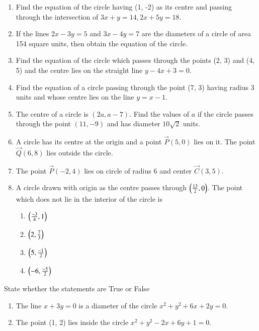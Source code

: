 \begin{enumerate}[label=\thesubsection.\arabic*, ref=\thesubsection.\theenumi, resume*]
 \item Find the equation of the circle having (1, -2) as its centre  and passing through the intersection of $3x+y=14,  2x+5y=18$.
\item If the lines $2x-3y=5$ and $3x-4y=7$ are the diameters of a circle of area 154 square units,  then obtain the equation of the circle.
\item Find the equation of the circle which passes through the points (2, 3) and (4, 5) and the centre lies on the straight line $y-4x+3=0$.
\item Find the equation of a circle passing through the point (7, 3) having radius 3 units and whose centre lies on the line $y=x-1$.
\item The centre of a circle is $(2a,  a-7)$. Find the values of $a$ if the circle passes through the point $(11,  -9)$ and has diameter $10\sqrt{2}$ units.
\item A circle has its centre at the origin and a point $\vec{P}(5,  0)$ lies on it. The point $\vec{Q}(6,  8)$ lies outside the circle.
 \item The point $\vec{P}(-2,  4)$ lies on circle of radius 6 and center $\vec{C}(3,  5)$.
\item A circle drawn with origin as the
centre passes through 
		$\left(\frac{13}{2},  0\right)$. The
point which does not lie in the
interior of the circle is
\begin{enumerate}
\item $\left(\frac{-3}{4},  1\right)$
\item $\left(2,  \frac{7}{3}\right)$
\item $\left(5,  \frac{-1}{2}\right)$
\item $\left(-6,  \frac{-5}{2}\right)$
\end{enumerate}
\end{enumerate}
State whether the statements are True or False 
\begin{enumerate}[label=\thesubsection.\arabic*, ref=\thesubsection.\theenumi, resume*]
\item The line $x+3y=0$ is a diameter of the circle $x^2+y^2+6x+2y=0$.
\item The point (1, 2) lies inside the circle $x^2+y^2-2x+6y+1=0$.
\end{enumerate}
